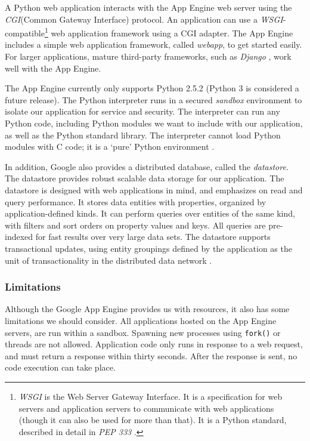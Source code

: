 A Python web application interacts with the App Engine web server using the
\emph{CGI}(Common Gateway Interface) protocol. An application can use a
\emph{WSGI}-compatible\footnote{\emph{WSGI} is the Web Server Gateway Interface.
It is a specification for web servers and application servers to communicate with
web applications (though it can also be used for more than that). It is a Python
standard, described in detail in \emph{PEP 333} \cite{wsgi-www, pep333-www}.} web
application framework using a CGI adapter. The App Engine includes a simple web
application framework, called \emph{webapp}, to get started easily. For larger
applications, mature third-party frameworks, such as \emph{Django}
\cite{django-www}, work well with the App Engine.

The App Engine currently only supports Python 2.5.2 (Python 3 is considered a
future release). The Python interpreter runs in a secured \emph{sandbox}
environment to isolate our application for service and security. The interpreter
can run any Python code, including Python modules we want to  include with our
application, as well as the Python standard library. The interpreter cannot load
Python modules with C code; it is a `pure' Python environment
\cite{app-engine-sandbox}.

In addition, Google also provides a distributed database, called the
\emph{datastore}. The datastore provides robust scalable data storage for our
application. The datastore is designed with web applications in mind, and
emphasizes on read and query performance. It stores data entities with
properties, organized by application-defined kinds. It can perform queries over
entities of the same kind, with filters and sort orders on property values and
keys. All queries are pre-indexed for fast results over very large data sets. The
datastore supports transactional updates, using entity groupings defined by the
application as the unit of transactionality in the distributed data network
\cite{app-engine-datastore}.

\subsubsection{Limitations}
Although the Google App Engine provides us with resources, it also has some
limitations we should consider. All applications hosted on the App Engine
servers, are run within a sandbox. Spawning new processes using \texttt{fork()}
or threads are not allowed. Application code only runs in response to a web
request, and must return a response within thirty seconds. After the
response is sent, no code execution can take place.


